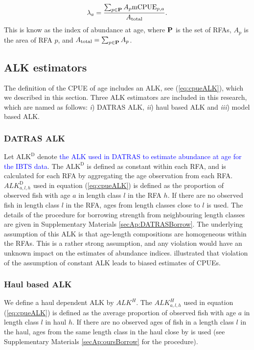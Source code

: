 \documentclass[a4paper 12pt]{article}
\numberwithin{equation}{section}
\newcommand{\nat}[1]{\textcolor{blue}{#1}}
\begin{document}
\begin{equation}
\lambda_{a}= \frac{\sum_{p\in {\bf P}} A_{p}  \mathrm{mCPUE}_{p,a}}{A_{\text{total}}}.
\label{abundanceestimatornorthsea}
\end{equation}
This is know as the index of abundance at age, where ${\bf P}$ is the set of RFAs, $A_p$ is the area of RFA $p$, and $A_{\text{total}} = \sum_{p\in {\bf P}} A_{p}$.
\subsection{ALK estimators}
\label{sec:alkmethods}
The definition of the CPUE of age includes an ALK, see (\ref{eq:cpueALK}), which we described in this section. Three ALK estimators are included in this research, which are named as follows:  \textit{i}) DATRAS ALK, \textit{ii}) haul based ALK and \textit{iii}) model based ALK.
\subsubsection{DATRAS ALK}
\label{sec:datrasalkestimator}
Let $\text{ALK}^{\text{D}}$ denote \nat{the ALK used in DATRAS to estimate abundance at age for the IBTS data}. The $\text{ALK}^{\text{D}}$ is defined as constant within each RFA, and is calculated for each RFA by aggregating the age observation from each RFA. $ALK^{\text{D}}_{a,l,h}$ used in equation (\ref{eq:cpueALK}) is defined as the proportion of observed fish with age $a$ in length class $l$ in the RFA $h$. If there are no observed fish in length class $l$ in the RFA, ages from length classes close to $l$ is used. The details of the procedure for borrowing strength from neighbouring length classes are given in Supplementary Materials \ref{secAp:DATRASBorrow}. The underlying assumption of this ALK  is that age-length compositions are homogeneous within the RFAs. This is a rather strong assumption, and any violation would have an unknown impact on the estimates of abundance indices. \citet{aanes2015efficient} illustrated that violation of the assumption of constant ALK leads to biased estimates of CPUEs. 

\subsubsection{Haul based ALK}
\label{sec:haulestimator}
We define a haul dependent ALK  by  $ALK^{H}$. The $ALK^{H}_{a,l,h}$  used in equation (\ref{eq:cpueALK}) is defined as the average proportion of observed fish with age $a$ in  length class $l$ in haul $h$. If there are no observed ages of fish in a length class $l$ in the haul, ages from the same length class in the haul close by is used (see Supplementary Materials \ref{secAp:oursBorrow} for the procedure).
\end{document}
